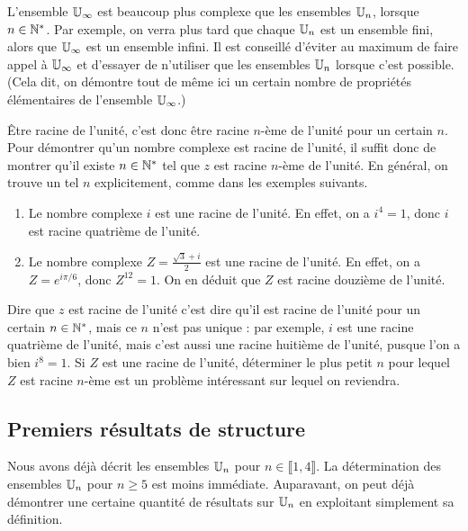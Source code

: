 \begin{attention}
L'ensemble $\mathbb{U}_\infty$ est beaucoup plus complexe que les ensembles $\mathbb{U}_n$, lorsque $n\in \mathbb{N}^*$. Par exemple, on verra plus tard que chaque $\mathbb{U}_n$ est un ensemble fini, alors que $\mathbb{U}_\infty$ est un ensemble infini. Il est conseillé d'éviter au maximum de faire appel à $\mathbb{U}_\infty$ et d'essayer de n'utiliser que les ensembles $\mathbb{U}_n$ lorsque c'est possible. (Cela dit, on démontre tout de même ici un certain nombre de propriétés élémentaires de l'ensemble $\mathbb{U}_\infty$.)
\end{attention}



Être racine de l'unité, c'est donc être racine $n$-ème de l'unité \og pour un certain $n$\fg. Pour démontrer qu'un nombre complexe est racine de l'unité, il suffit donc de montrer qu'il existe $n\in\mathbb{N}^*$ tel que $z$ est racine $n$-ème de l'unité. En général, on trouve un tel $n$ explicitement, comme dans les exemples suivants.

\begin{exemple}
\begin{enumerate}
\item Le nombre complexe $i$ est une racine de l'unité. En effet, on a $i^4=1$, donc $i$ est racine quatrième de l'unité.
\item Le nombre complexe $Z=\frac{\sqrt 3+i}{2}$ est une racine de l'unité. En effet, on a $Z=e^{i\pi/6}$, donc $Z^{12}=1$. On en déduit que $Z$ est racine douzième de l'unité.
\end{enumerate}
\end{exemple}

\begin{remarque}
Dire que $z$ est racine de l'unité c'est dire qu'il est racine de l'unité \og pour un certain $n\in\mathbb{N}^*$\fg, mais ce $n$ n'est pas unique : par exemple, $i$ est une racine quatrième de l'unité, mais c'est aussi une racine huitième de l'unité, pusque l'on a bien $i^8=1$. Si $Z$ est une racine de l'unité, déterminer le \og plus petit $n$\fg{} pour lequel $Z$ est racine $n$-ème est un problème intéressant sur lequel on reviendra.
\end{remarque}

\subsection{Premiers résultats de structure}

Nous avons déjà décrit les ensembles $\mathbb{U}_n$ pour $n\in \llbracket 1,4\rrbracket$. La détermination des ensembles $\mathbb{U}_n$ pour $n \geq 5$ est moins immédiate. Auparavant, on peut déjà démontrer une certaine quantité de résultats sur $\mathbb{U}_n$ en exploitant simplement sa définition.

